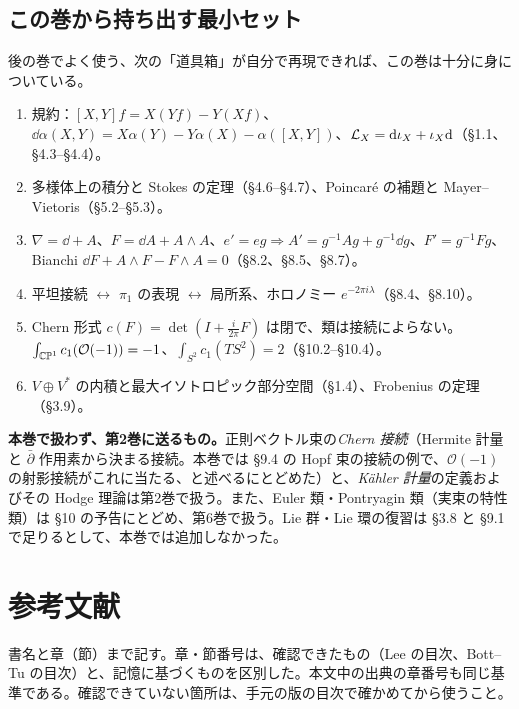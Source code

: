 \subsection*{この巻から持ち出す最小セット}
後の巻でよく使う、次の「道具箱」が自分で再現できれば、この巻は十分に身についている。
\begin{enumerate}[label=(\arabic*),itemsep=2pt]
\item 規約：$[X,Y]f=X(Yf)-Y(Xf)$、$\dd\alpha(X,Y)=X\alpha(Y)-Y\alpha(X)-\alpha([X,Y])$、$\mathcal L_X=\mathrm{d}\iota_X+\iota_X\mathrm{d}$（§1.1、§4.3--§4.4）。
\item 多様体上の積分と Stokes の定理（§4.6--§4.7）、Poincaré の補題と Mayer--Vietoris（§5.2--§5.3）。
\item $\nabla=\dd+A$、$F=\dd A+A\wedge A$、$e'=eg\Rightarrow A'=g^{-1}Ag+g^{-1}\dd g$、$F'=g^{-1}Fg$、Bianchi $\dd F+A\wedge F-F\wedge A=0$（§8.2、§8.5、§8.7）。
\item 平坦接続 $\leftrightarrow$ $\pi_1$ の表現 $\leftrightarrow$ 局所系、ホロノミー $e^{-2\pi i\lambda}$（§8.4、§8.10）。
\item Chern 形式 $c(F)=\det(I+\frac i{2\pi}F)$ は閉で、類は接続によらない。$\int_{\mathbb{CP}^1}c_1(\mathcal O(-1))=-1$、$\int_{S^2}c_1(TS^2)=2$（§10.2--§10.4）。
\item $V\oplus V^*$ の内積と最大イソトロピック部分空間（§1.4）、Frobenius の定理（§3.9）。
\end{enumerate}
\textbf{本巻で扱わず、第2巻に送るもの。}正則ベクトル束の\emph{Chern 接続}（Hermite 計量と $\bar\partial$ 作用素から決まる接続。本巻では §9.4 の Hopf 束の接続の例で、$\mathcal O(-1)$ の射影接続がこれに当たる、と述べるにとどめた）と、\emph{Kähler 計量}の定義およびその Hodge 理論は第2巻で扱う。また、Euler 類・Pontryagin 類（実束の特性類）は §10 の予告にとどめ、第6巻で扱う。Lie 群・Lie 環の復習は §3.8 と §9.1 で足りるとして、本巻では追加しなかった。

\clearpage
\section*{参考文献}
書名と章（節）まで記す。章・節番号は、確認できたもの（Lee の目次、Bott--Tu の目次）と、記憶に基づくもの\tQ を区別した。本文中の出典の章番号も同じ基準である。確認できていない箇所は、手元の版の目次で確かめてから使うこと。

